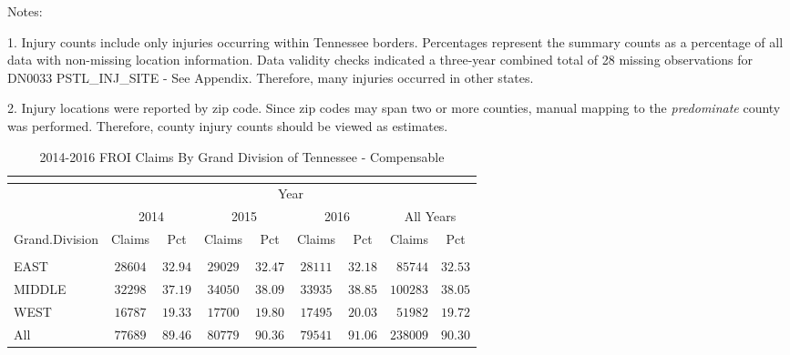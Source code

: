 \documentclass[9pt, oneside]{article}   	%
\begin{document}
    \begin{tablenotes}
      \small
      Notes:\\
      \item 1. Injury counts include only injuries occurring within Tennessee borders. Percentages represent the summary counts as a percentage of all data with non-missing location information. Data validity checks indicated a three-year combined total of 28 missing observations for DN0033 PSTL\_INJ\_SITE - See Appendix. Therefore, many injuries occurred in other states.\\
      \item 2. Injury locations were reported by zip code. Since zip codes may span two or more counties, manual mapping to the \textit{predominate} county was performed. Therefore, county injury counts should be viewed as estimates.\\

      \end{tablenotes}
      
\pagebreak

\begin{longtable}{lcccccccc}
\caption{2014-2016 FROI Claims By Grand Division of Tennessee - Compensable}\\ 
\label{Table: Grand}\\
\hline
                  \toprule
 & \multicolumn{8}{c}{Year} \\ 
 & \multicolumn{2}{c}{2014} & \multicolumn{2}{c}{2015} & \multicolumn{2}{c}{2016} & \multicolumn{2}{c}{All Years} \\ 
Grand.Division  & Claims & Pct & Claims & Pct & Claims & Pct & Claims & \multicolumn{1}{c}{Pct} \\ 
\midrule\\ [-1\normalbaselineskip]\hline\endhead\hline\endfoot
EAST  & $28604$ & $32.94$ & $29029$ & $32.47$ & $28111$ & $32.18$ & $\phantom{0}85744$ & $32.53$ \\
MIDDLE  & $32298$ & $37.19$ & $34050$ & $38.09$ & $33935$ & $38.85$ & $100283$ & $38.05$ \\
WEST  & $16787$ & $19.33$ & $17700$ & $19.80$ & $17495$ & $20.03$ & $\phantom{0}51982$ & $19.72$ \\
\cline{1-1} \cline{2-2} \cline{3-3} \cline{4-4} \cline{5-5} \cline{6-6} \cline{7-7} \cline{8-8} \cline{9-9}%
All  & $77689$ & $89.46$ & $80779$ & $90.36$ & $79541$ & $91.06$ & $238009$ & $90.30$ \\
\hline 
\end{longtable}
\end{document}

